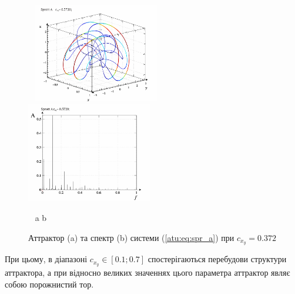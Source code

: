\begin{figure}[htb!]
\begin{center}
  ~ \hfill
  \includegraphics[width=0.49\textwidth]{p/cha/spr_a/sprott_a-p_xyz_cx_y=0x372.png}
  \hfill
  \includegraphics[width=0.49\textwidth]{p/cha/spr_a/sprott_a_f-p_f_cx_y=0x372.png}
  \hfill ~
\end{center}
\vspace{-1.5ex}
\begin{center}
  ~ \hfill a \hfill\hfill b \hfill ~
\end{center}
\vspace{-2.0ex}
\caption{Аттрактор (a) та спектр (b) системи (\ref{atu:eq:spr_a}) при $c_{x_y} =0.372$}
\label{atu:f:spr_a_p_0372}
\end{figure}

При цьому, в діапазоні
$c_{x_y} \in [0.1; 0.7]$ спостерігаються перебудови структури аттрактора,
а при відносно великих значеннях цього параметра аттрактор
являє собою порожнистий тор.

